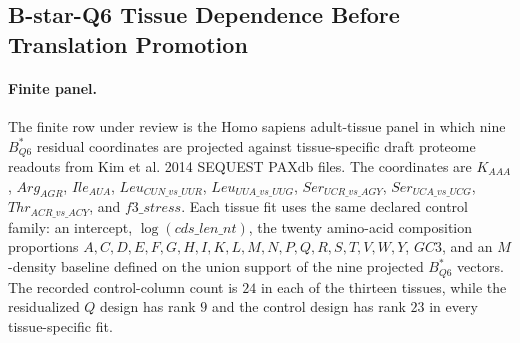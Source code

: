 
\subsection{B-star-Q6 Tissue Dependence Before Translation Promotion}
\label{subsec:bioreality-b-star-q6-tissue-dependence-before-translation-promotion}

\paragraph{Finite panel.}
The finite row under review is the Homo sapiens adult-tissue panel in which nine $B^*_{Q6}$ residual coordinates are projected against tissue-specific draft proteome readouts from Kim et al. 2014 SEQUEST PAXdb files.  The coordinates are $K_{AAA}$, $Arg_{AGR}$, $Ile_{AUA}$, $Leu_{CUN\_vs\_UUR}$, $Leu_{UUA\_vs\_UUG}$, $Ser_{UCR\_vs\_AGY}$, $Ser_{UCA\_vs\_UCG}$, $Thr_{ACR\_vs\_ACY}$, and $f3\_stress$.  Each tissue fit uses the same declared control family: an intercept, $\log(cds\_len\_nt)$, the twenty amino-acid composition proportions $A,C,D,E,F,G,H,I,K,L,M,N,P,Q,R,S,T,V,W,Y$, $GC3$, and an $M$-density baseline defined on the union support of the nine projected $B^*_{Q6}$ vectors.  The recorded control-column count is $24$ in each of the thirteen tissues, while the residualized $Q$ design has rank $9$ and the control design has rank $23$ in every tissue-specific fit.

